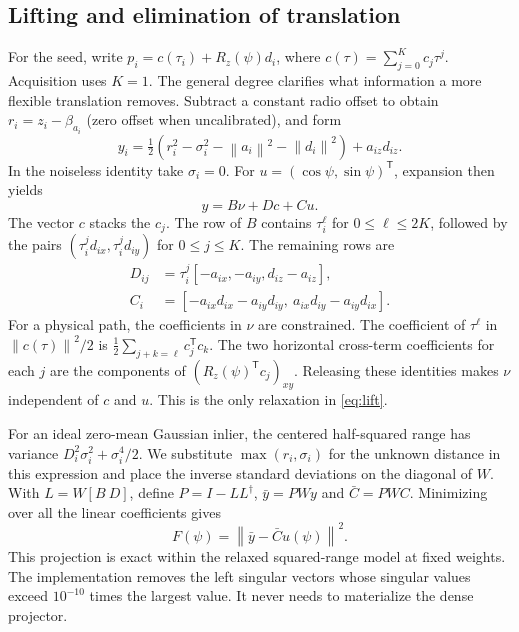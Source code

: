 \documentclass{IEEEtaes}
\newcommand{\rz}{R_z}
\newcommand{\norm}[1]{\left\lVert#1\right\rVert}
\newcommand{\trans}{^{\mathsf T}}
\begin{document}
\subsection{Lifting and elimination of translation}
For the seed, write \(p_i=c(\tau_i)+\rz(\psi)d_i\), where \(c(\tau)=\sum_{j=0}^{K}c_j\tau^j\). Acquisition uses \(K=1\). The general degree clarifies what information a more flexible translation removes. Subtract a constant radio offset to obtain \(r_i=z_i-\beta_{a_i}\) (zero offset when uncalibrated), and form
\begin{equation}
 y_i=\tfrac12(r_i^2-\sigma_i^2-\norm{a_i}^2-\norm{d_i}^2)
              +a_{iz}d_{iz}. \label{eq:y}
\end{equation}
In the noiseless identity take \(\sigma_i=0\). For \(u=(\cos\psi,\sin\psi)\trans\), expansion then yields
\begin{equation}
 y=B\nu+Dc+Cu . \label{eq:lift}
\end{equation}
The vector \(c\) stacks the \(c_j\). The row of \(B\) contains \(\tau_i^\ell\) for \(0\le\ell\le 2K\), followed by the pairs \((\tau_i^j d_{ix},\tau_i^j d_{iy})\) for \(0\le j\le K\). The remaining rows are
\begin{align}
 D_{ij}&=\tau_i^j[-a_{ix},-a_{iy},d_{iz}-a_{iz}],\nonumber\\
 C_i&=[-a_{ix}d_{ix}-a_{iy}d_{iy},\ a_{ix}d_{iy}-a_{iy}d_{ix}].
 \label{eq:rows}
\end{align}
For a physical path, the coefficients in \(\nu\) are constrained. The coefficient of \(\tau^\ell\) in \(\norm{c(\tau)}^2/2\) is \(\tfrac12\sum_{j+k=\ell} c_j\trans c_k\). The two horizontal cross-term coefficients for each \(j\) are the components of \((\rz(\psi)\trans c_j)_{xy}\). Releasing these identities makes \(\nu\) independent of \(c\) and \(u\). This is the only relaxation in \eqref{eq:lift}.

For an ideal zero-mean Gaussian inlier, the centered half-squared range has variance \(D_i^2\sigma_i^2+\sigma_i^4/2\). We substitute \(\max(r_i,\sigma_i)\) for the unknown distance in this expression and place the inverse standard deviations on the diagonal of \(W\). With \(L=W[B\ D]\), define \(P=I-LL^\dagger\), \(\bar y=PWy\) and \(\bar C=PWC\). Minimizing over all the linear coefficients gives
\begin{equation}
 F(\psi)=\norm{\bar y-\bar C u(\psi)}^2. \label{eq:circle}
\end{equation}
This projection is exact within the relaxed squared-range model at fixed weights. The implementation removes the left singular vectors whose singular values exceed \(10^{-10}\) times the largest value. It never needs to materialize the dense projector.
\end{document}
